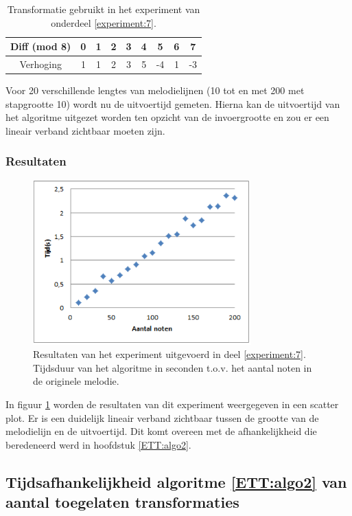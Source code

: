 \begin{table}
  \centering
  \begin{tabular}{c | c c c c c c c c }
    Diff (mod 8) & 0 & 1 & 2 & 3 & 4 & 5 & 6 & 7 \\
    \hline
    \hline
    Verhoging & 1 & 1 & 2 & 3 & 5 & -4 & 1 & -3 \\
  \end{tabular}
  \caption{Transformatie gebruikt in het experiment van onderdeel \ref{experiment:7}.}
  \label{tabel:exp7}
\end{table}

Voor 20 verschillende lengtes van melodielijnen (10 tot en met 200 met stapgrootte 10) wordt nu de uitvoertijd gemeten. Hierna kan de uitvoertijd van het algoritme uitgezet worden ten opzicht van de invoergrootte en zou er een lineair verband zichtbaar moeten zijn.

\subsubsection{Resultaten}
\begin{figure}[!ht]
  \centering
  \includegraphics[width=0.75\textwidth]{5_Experimenten_Resultaten/exp7_res}
  \caption{Resultaten van het experiment uitgevoerd in deel \ref{experiment:7}. Tijdsduur van het algoritme in seconden t.o.v. het aantal noten in de originele melodie.}
  \label{figuur:exp7}
\end{figure}

In figuur \ref{figuur:exp7} worden de resultaten van dit experiment weergegeven in een scatter plot. Er is een duidelijk lineair verband zichtbaar tussen de grootte van de melodielijn en de uitvoertijd. Dit komt overeen met de afhankelijkheid die beredeneerd werd in hoofdstuk \ref{ETT:algo2}.

\subsection{Tijdsafhankelijkheid algoritme \ref{ETT:algo2} van aantal toegelaten transformaties}
\label{experiment:8}

